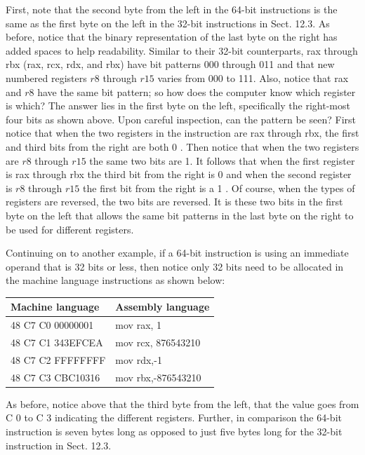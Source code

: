 \documentclass[10pt]{book}
\begin{document}
First, note that the second byte from the left in the 64-bit instructions is the same as the first byte on the left in the 32-bit instructions in Sect. 12.3. As before, notice that the binary representation of the last byte on the right has added spaces to help readability. Similar to their 32-bit counterparts, rax through rbx (rax, rcx, rdx, and rbx) have bit patterns 000 through 011 and that new numbered registers $r 8$ through $r 15$ varies from 000 to 111. Also, notice that rax and $r 8$ have the same bit pattern; so how does the computer know which register is which? The answer lies in the first byte on the left, specifically the right-most four bits as shown above. Upon careful inspection, can the pattern be seen? First notice that when the two registers in the instruction are rax through rbx, the first and third bits from the right are both 0 . Then notice that when the two registers are $r 8$ through $r 15$ the same two bits are 1. It follows that when the first register is rax through rbx the third bit from the right is 0 and when the second register is $r 8$ through $r 15$ the first bit from the right is a 1 . Of course, when the types of registers are reversed, the two bits are reversed. It is these two bits in the first byte on the left that allows the same bit patterns in the last byte on the right to be used for different registers.

Continuing on to another example, if a 64-bit instruction is using an immediate operand that is 32 bits or less, then notice only 32 bits need to be allocated in the machine language instructions as shown below:

\begin{center}
\begin{tabular}{|l|l|}
\hline
Machine language & Assembly language \\
\hline
48 C7 C0 00000001 & mov rax, 1 \\
\hline
48 C7 C1 343EFCEA & mov rcx, 876543210 \\
\hline
48 C7 C2 FFFFFFFF & mov rdx,-1 \\
\hline
48 C7 C3 CBC10316 & mov rbx,-876543210 \\
\hline
\end{tabular}
\end{center}

As before, notice above that the third byte from the left, that the value goes from C 0 to C 3 indicating the different registers. Further, in comparison the 64-bit instruction is seven bytes long as opposed to just five bytes long for the 32-bit instruction in Sect. 12.3.
\end{document}
